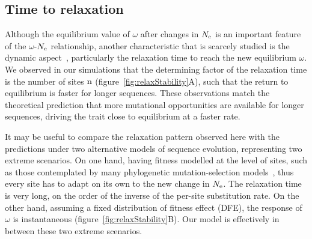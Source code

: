 \subsection{Time to relaxation}

Although the equilibrium value of $\omega$ after changes in $N_{\mathrm{e}}$ is an important feature of the $\omega$-$N_{\mathrm{e}}$ relationship, another characteristic that is scarcely studied is the dynamic aspect~\citep{Jones2016}, particularly the relaxation time to reach the new equilibrium $\omega$.
We observed in our simulations that the determining factor of the relaxation time is the number of sites $\text{n}$ (figure~\ref{fig:relaxStability}A), such that the return to equilibrium is faster for longer sequences.
These observations match the theoretical prediction that more mutational opportunities are available for longer sequences, driving the trait close to equilibrium at a faster rate.

It may be useful to compare the relaxation pattern observed here with the predictions under two alternative models of sequence evolution, representing two extreme scenarios.
On one hand, having fitness modelled at the level of sites, such as those contemplated by many phylogenetic mutation-selection models~\citep{Halpern1998, Rodrigue2010, Tamuri2012}, thus every site has to adapt on its own to the new change in $N_{\mathrm{e}}$.
The relaxation time is very long, on the order of the inverse of the per-site substitution rate.
On the other hand, assuming a fixed distribution of fitness effect (\acrshort{DFE}), the response of $\omega$ is instantaneous (figure~\ref{fig:relaxStability}B).
Our model is effectively in between these two extreme scenarios.

